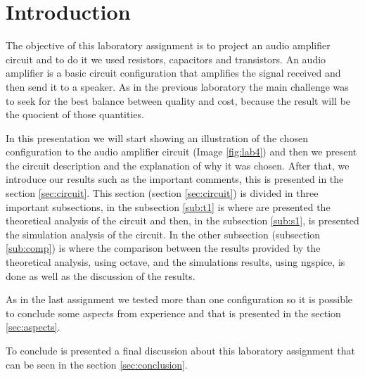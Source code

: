\newpage
\section{Introduction}
\label{sec:introduction}

The objective of this laboratory assignment is to project an audio amplifier circuit and to do it we used resistors, capacitors and transistors.
An audio amplifier is a basic circuit configuration that amplifies the signal received and then send it to a speaker.
As in the previous laboratory the main challenge was to seek for the best balance between quality and cost, because the result will be the quocient of those quantities.

In this presentation we will start showing an illustration of the chosen configuration to the audio amplifier circuit (Image \ref{fig:lab4}) and then we present the circuit 
description and the explanation of why it was chosen. 
After that, we introduce our results such as the important comments, this is presented in the section \ref{sec:circuit}. This section (section \ref{sec:circuit}) is divided 
in three important subsections, 
in the subsection \ref{sub:t1} is where are presented the theoretical analysis of the circuit and then, in the subsection \ref{sub:s1}, is presented the simulation analysis
 of the circuit. In the other subsection (subsection \ref{sub:comp}) is where the comparison between the results provided by the theoretical analysis, using octave, and 
the simulations results, using ngspice, is done as well as the discussion of the results.


As in the last assignment we tested more than one configuration so it is possible to conclude some aspects from experience and that is presented in the section
 \ref{sec:aspects}.

To conclude is presented a final discussion about this laboratory assignment that can be seen in the section \ref{sec:conclusion}.




